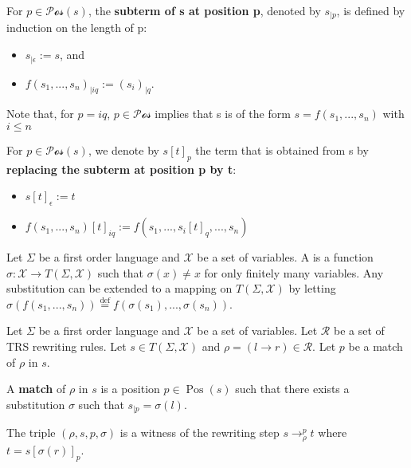   \begin{definition}
    For $p \in \mathcal{Pos}(s)$, the \textbf{subterm of s at position p}, denoted by $s_{|p}$, is defined by induction on the length of p:
    \begin{itemize}
      \item $s_{|\epsilon} := s$, and
      \item $f(s_1,...,s_n)_{|iq} := \left(s_i\right)_{|q}$.
    \end{itemize} 
    
    Note that, for $p = iq$, $p \in \mathcal{Pos}$ implies that s is of the form $s = f(s_1,...,s_n)$ with $i \le n$
    
    For $p \in \mathcal{Pos}(s)$, we denote by $s[t]_p$ the term that is obtained from s by \textbf{replacing the subterm at position p by t}:
  \begin{itemize}
    \item $s[t]_\epsilon := t$
    \item $f(s_1,...,s_n)[t]_{iq} := f(s_1,...,s_i[t]_{q},...,s_n)$
  \end{itemize}
 
  \end{definition}
   
  \begin{definition}[Substitution]
    Let $\Sigma$ be a first order language and $\mathcal{X}$ be a set of variables.
    A  is a function $\sigma : \mathcal{X} \rightarrow T(\Sigma, \mathcal{X})$ such that $\sigma(x) \not = x$ for only finitely many variables. Any substitution can be extended to a mapping on $T(\Sigma,\mathcal{X})$ by letting $\sigma(f(s_1,...,s_n)) \overset{\operatorname{def}}{=}f(\sigma(s_1),...,\sigma(s_n))$.
  \end{definition}

   
  \begin{definition}
    \label{def:trs:rewriting}
    Let $\Sigma$ be a first order language and $\mathcal{X}$ be a set of variables. Let $\mathcal{R}$ be a set of TRS rewriting rules. Let $s \in T(\Sigma, \mathcal{X})$ and $\rho = (l \to r) \in \mathcal{R}$. Let $p$ be a match of $\rho$ in $s$.

      A \textbf{match} of $\rho$ in $s$ is a position $p \in \operatorname{Pos}(s)$ such that there exists a substitution $\sigma$ such that $s_{|p} = \sigma(l)$.

    The triple $(\rho, s, p, \sigma)$ is a witness of the rewriting step $s \to_\rho^p t$ where $t = s[\sigma(r)]_p$.
  \end{definition}
  
